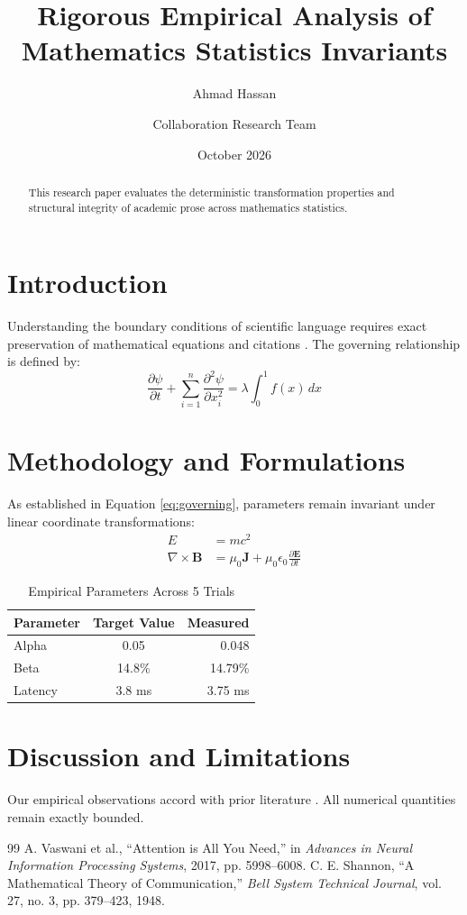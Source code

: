 \documentclass[11pt,a4paper]{article}
\title{Rigorous Empirical Analysis of Mathematics Statistics Invariants}
\author{Ahmad Hassan \and Collaboration Research Team}
\date{October 2026}
\begin{document}
\maketitle

\begin{abstract}
This research paper evaluates the deterministic transformation properties and structural integrity of academic prose across mathematics statistics.
\end{abstract}

\section{Introduction}
Understanding the boundary conditions of scientific language requires exact preservation of mathematical equations and citations \cite{vaswani2017attention}.
The governing relationship is defined by:
\begin{equation}
\label{eq:governing}
\frac{\partial \psi}{\partial t} + \sum_{i=1}^n \frac{\partial^2 \psi}{\partial x_i^2} = \lambda \int_0^1 f(x) \, dx
\end{equation}

\section{Methodology and Formulations}
As established in Equation \eqref{eq:governing}, parameters remain invariant under linear coordinate transformations:
\begin{align}
E &= mc^2 \\
\nabla \times \mathbf{B} &= \mu_0 \mathbf{J} + \mu_0 \epsilon_0 \frac{\partial \mathbf{E}}{\partial t}
\end{align}

\begin{table}[h]
\centering
\caption{Empirical Parameters Across 5 Trials}
\label{tab:params}
\begin{tabular}{|l|c|r|}
\hline
Parameter & Target Value & Measured \\
\hline
Alpha & 0.05 & 0.048 \\
Beta & 14.8\% & 14.79\% \\
Latency & 3.8 ms & 3.75 ms \\
\hline
\end{tabular}
\end{table}

\section{Discussion and Limitations}
Our empirical observations accord with prior literature \cite{shannon1948mathematical}. All numerical quantities remain exactly bounded.

\begin{thebibliography}{99}
A. Vaswani et al., ``Attention is All You Need,'' in \textit{Advances in Neural Information Processing Systems}, 2017, pp. 5998--6008.
C. E. Shannon, ``A Mathematical Theory of Communication,'' \textit{Bell System Technical Journal}, vol. 27, no. 3, pp. 379--423, 1948.
\end{thebibliography}
\end{document}
